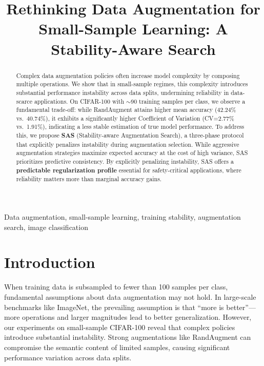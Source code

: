 \documentclass[conference,letterpaper]{IEEEtran}
\begin{document}
\title{Rethinking Data Augmentation for Small-Sample Learning: A Stability-Aware Search}

\author{
}

\maketitle

\begin{abstract}
Complex data augmentation policies often increase model complexity by composing multiple operations. We show that in small-sample regimes, this complexity introduces substantial performance instability across data splits, undermining reliability in data-scarce applications. On CIFAR-100 with $\sim$90 training samples per class, we observe a fundamental trade-off: while RandAugment attains higher mean accuracy (42.24\% vs.\ 40.74\%), it exhibits a significantly higher Coefficient of Variation (CV=2.77\% vs.\ 1.91\%), indicating a less stable estimation of true model performance. To address this, we propose \textbf{SAS} (Stability-aware Augmentation Search), a three-phase protocol that explicitly penalizes instability during augmentation selection. While aggressive augmentation strategies maximize expected accuracy at the cost of high variance, SAS prioritizes predictive consistency. By explicitly penalizing instability, SAS offers a \textbf{predictable regularization profile} essential for safety-critical applications, where reliability matters more than marginal accuracy gains.
\end{abstract}

\begin{IEEEkeywords}
Data augmentation, small-sample learning, training stability, augmentation search, image classification
\end{IEEEkeywords}

\section{Introduction}

When training data is subsampled to fewer than 100 samples per class, fundamental assumptions about data augmentation may not hold. In large-scale benchmarks like ImageNet, the prevailing assumption is that ``more is better''---more operations and larger magnitudes lead to better generalization. However, our experiments on small-sample CIFAR-100 reveal that complex policies introduce substantial instability. Strong augmentations like RandAugment can compromise the semantic content of limited samples, causing significant performance variation across data splits.
\end{document}
